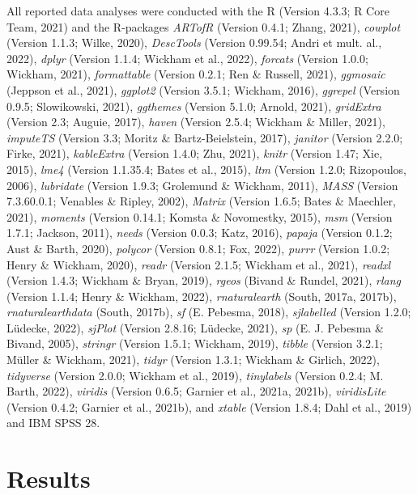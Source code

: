 \documentclass[
  man]{apa6}
\begin{document}
All reported data analyses were conducted with the R (Version 4.3.3; R Core Team, 2021) and the R-packages \emph{ARTofR} (Version 0.4.1; Zhang, 2021), \emph{cowplot} (Version 1.1.3; Wilke, 2020), \emph{DescTools} (Version 0.99.54; Andri et mult. al., 2022), \emph{dplyr} (Version 1.1.4; Wickham et al., 2022), \emph{forcats} (Version 1.0.0; Wickham, 2021), \emph{formattable} (Version 0.2.1; Ren \& Russell, 2021), \emph{ggmosaic} (Jeppson et al., 2021), \emph{ggplot2} (Version 3.5.1; Wickham, 2016), \emph{ggrepel} (Version 0.9.5; Slowikowski, 2021), \emph{ggthemes} (Version 5.1.0; Arnold, 2021), \emph{gridExtra} (Version 2.3; Auguie, 2017), \emph{haven} (Version 2.5.4; Wickham \& Miller, 2021), \emph{imputeTS} (Version 3.3; Moritz \& Bartz-Beielstein, 2017), \emph{janitor} (Version 2.2.0; Firke, 2021), \emph{kableExtra} (Version 1.4.0; Zhu, 2021), \emph{knitr} (Version 1.47; Xie, 2015), \emph{lme4} (Version 1.1.35.4; Bates et al., 2015), \emph{ltm} (Version 1.2.0; Rizopoulos, 2006), \emph{lubridate} (Version 1.9.3; Grolemund \& Wickham, 2011), \emph{MASS} (Version 7.3.60.0.1; Venables \& Ripley, 2002), \emph{Matrix} (Version 1.6.5; Bates \& Maechler, 2021), \emph{moments} (Version 0.14.1; Komsta \& Novomestky, 2015), \emph{msm} (Version 1.7.1; Jackson, 2011), \emph{needs} (Version 0.0.3; Katz, 2016), \emph{papaja} (Version 0.1.2; Aust \& Barth, 2020), \emph{polycor} (Version 0.8.1; Fox, 2022), \emph{purrr} (Version 1.0.2; Henry \& Wickham, 2020), \emph{readr} (Version 2.1.5; Wickham et al., 2021), \emph{readxl} (Version 1.4.3; Wickham \& Bryan, 2019), \emph{rgeos} (Bivand \& Rundel, 2021), \emph{rlang} (Version 1.1.4; Henry \& Wickham, 2022), \emph{rnaturalearth} (South, 2017a, 2017b), \emph{rnaturalearthdata} (South, 2017b), \emph{sf} (E. Pebesma, 2018), \emph{sjlabelled} (Version 1.2.0; Lüdecke, 2022), \emph{sjPlot} (Version 2.8.16; Lüdecke, 2021), \emph{sp} (E. J. Pebesma \& Bivand, 2005), \emph{stringr} (Version 1.5.1; Wickham, 2019), \emph{tibble} (Version 3.2.1; Müller \& Wickham, 2021), \emph{tidyr} (Version 1.3.1; Wickham \& Girlich, 2022), \emph{tidyverse} (Version 2.0.0; Wickham et al., 2019), \emph{tinylabels} (Version 0.2.4; M. Barth, 2022), \emph{viridis} (Version 0.6.5; Garnier et al., 2021a, 2021b), \emph{viridisLite} (Version 0.4.2; Garnier et al., 2021b), and \emph{xtable} (Version 1.8.4; Dahl et al., 2019) and IBM SPSS 28.

\section{Results}\label{results}
\end{document}
